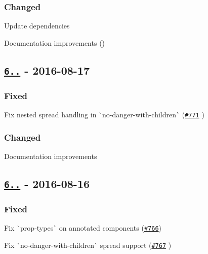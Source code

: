 \subsubsection*{Changed}


\begin{DoxyItemize}
\item Update dependencies
\item Documentation improvements ()
\end{DoxyItemize}

\subsection*{\href{https://github.com/yannickcr/eslint-plugin-react/compare/v6.1.1...v6.1.2}{\tt 6..} -\/ 2016-\/08-\/17}

\subsubsection*{Fixed}


\begin{DoxyItemize}
\item Fix nested spread handling in \`{}no-\/danger-\/with-\/children\`{} (\href{https://github.com/yannickcr/eslint-plugin-react/issues/771}{\tt \#771} )
\end{DoxyItemize}

\subsubsection*{Changed}


\begin{DoxyItemize}
\item Documentation improvements
\end{DoxyItemize}

\subsection*{\href{https://github.com/yannickcr/eslint-plugin-react/compare/v6.1.0...v6.1.1}{\tt 6..} -\/ 2016-\/08-\/16}

\subsubsection*{Fixed}


\begin{DoxyItemize}
\item Fix \`{}prop-\/types\`{} on annotated components (\href{https://github.com/yannickcr/eslint-plugin-react/issues/766}{\tt \#766})
\item Fix \`{}no-\/danger-\/with-\/children\`{} spread support (\href{https://github.com/yannickcr/eslint-plugin-react/issues/767}{\tt \#767} )
\end{DoxyItemize}

